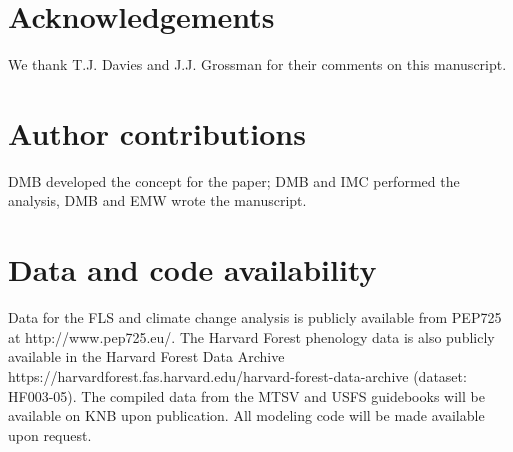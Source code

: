 \documentclass[11pt]{article}
\begin{document}

\section*{Acknowledgements}
\noindent We thank T.J. Davies and J.J. Grossman for their comments on this manuscript.

\section*{Author contributions}
DMB developed the concept for the paper; DMB and IMC performed the analysis, DMB and EMW wrote the manuscript.

\section*{Data and code availability}
Data for the FLS and climate change analysis is publicly available from PEP725 at http://www.pep725.eu/. The Harvard Forest phenology data is also publicly available in the Harvard Forest Data Archive https://harvardforest.fas.harvard.edu/harvard-forest-data-archive (dataset: HF003-05). The compiled data from the MTSV and USFS guidebooks will be available on KNB upon publication. All modeling code will be made available upon request. %
\end{document}
